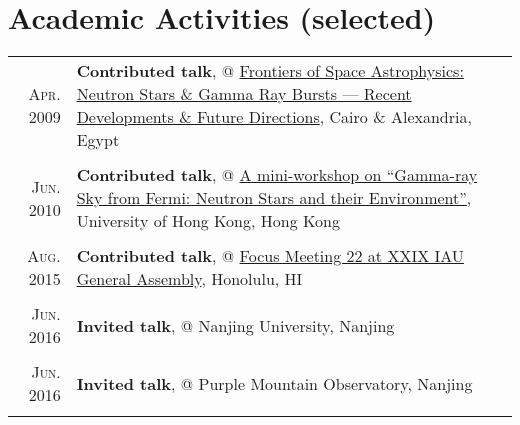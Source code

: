 \documentclass[letterpaper,10pt]{article}
\begin{document}
\section{Academic Activities (selected)}

\begin{longtable}{r|p{5.5in}}

    \textsc{Apr. 2009}   &   \textbf{Contributed talk}, @ \href{http://www.ns-grb.com/index0.html}{Frontiers of Space Astrophysics: Neutron Stars \& Gamma Ray Bursts --- Recent Developments \& Future Directions}, Cairo \& Alexandria, Egypt     \\
    \multicolumn{2}{c}{} \\

    \textsc{Jun. 2010}   &   \textbf{Contributed talk}, @ \href{http://www.physics.hku.hk/~astro/2010Astro/Index.htm}{A mini-workshop on ``Gamma-ray Sky from Fermi: Neutron Stars and their Environment''}, University of Hong Kong, Hong Kong   \\
    \multicolumn{2}{c}{} \\


    \textsc{Aug. 2015}   &   \textbf{Contributed talk}, @ \href{http://hffiau.epfl.ch/page-116896.html}{Focus Meeting 22 at XXIX IAU
General Assembly}, Honolulu, HI     \\
    \multicolumn{2}{c}{} \\

    \textsc{Jun. 2016}   &   \textbf{Invited talk}, @ Nanjing University, Nanjing \\
    \multicolumn{2}{c}{} \\

    \textsc{Jun. 2016}   &   \textbf{Invited talk}, @ Purple Mountain Observatory, Nanjing \\
    \multicolumn{2}{c}{} \\



\end{longtable}
\end{document}
